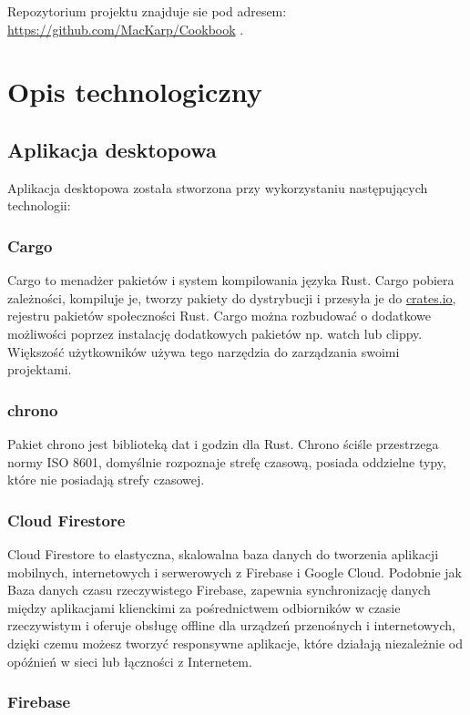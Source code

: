 \documentclass[12pt,a4paper]{article}
\begin{document}
		\indent Repozytorium projektu znajduje sie pod adresem: \url{https://github.com/MacKarp/Cookbook} .
	\newpage
	
	\section{Opis technologiczny}
		\subsection{Aplikacja desktopowa}
			
			\indent Aplikacja desktopowa została stworzona przy wykorzystaniu następujących technologii:
				\subsubsection{Cargo}

					\indent Cargo to menadżer pakietów i system kompilowania języka Rust. Cargo pobiera zależności, kompiluje je, tworzy pakiety do dystrybucji i przesyła je do
					\url{crates.io}, rejestru pakietów społeczności Rust. Cargo można rozbudować o dodatkowe możliwości poprzez instalację dodatkowych pakietów np. watch lub clippy. Większość
					użytkowników używa tego narzędzia do zarządzania swoimi projektami. 
				\subsubsection{chrono}

					\indent Pakiet chrono jest biblioteką dat i godzin dla Rust. Chrono ściśle przestrzega normy ISO 8601, domyślnie rozpoznaje strefę czasową,
				 	posiada oddzielne typy, które nie posiadają strefy czasowej. 
				\subsubsection{Cloud Firestore}

					\indent	Cloud Firestore to elastyczna, skalowalna baza danych do tworzenia aplikacji mobilnych, internetowych i serwerowych z Firebase i Google Cloud.
					Podobnie jak Baza danych czasu rzeczywistego Firebase, zapewnia synchronizację danych między aplikacjami klienckimi za pośrednictwem odbiorników w czasie
					rzeczywistym i oferuje obsługę offline dla urządzeń przenośnych i internetowych, dzięki czemu możesz tworzyć responsywne aplikacje, które działają niezależnie
					od opóźnień w sieci lub łączności z Internetem.
				\subsubsection{Firebase}
\end{document}
